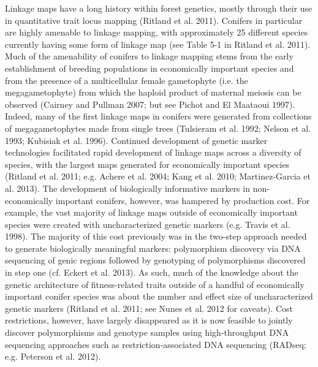 \documentclass[11pt]{article}
\begin{document}
Linkage maps have a long history within forest genetics, mostly through their use in quantitative trait locus mapping (Ritland et al. 2011). 
Conifers in particular are highly amenable to linkage mapping, with approximately 25 different species currently having some 
form of linkage map (see Table 5-1 in Ritland et al. 2011). Much of the amenability of conifers to linkage mapping stems from 
the early establishment of breeding populations in economically important species and from the presence of a multicellular 
female gametophyte (i.e. the megagametophyte) from which the haploid product of maternal meiosis can be observed (Cairney and Pullman 2007; 
but see Pichot and El Maataoui 1997). Indeed, many of the first linkage maps in conifers were generated from collections of 
megagametophytes made from single trees (Tulsieram et al. 1992; Nelson et al. 1993; Kubisiak et al. 1996). Continued development 
of genetic marker technologies facilitated rapid development of linkage maps across a diversity of species, with the largest maps 
generated for economically important species (Ritland et al. 2011; e.g. Achere et al. 2004; Kang et al. 2010; Martinez-Garcia et al. 2013). 
The development of biologically informative markers in non-economically important conifers, however, was hampered by production cost. 
For example, the vast majority of linkage maps outside of economically important species were created with uncharacterized genetic 
markers (e.g. Travis et al. 1998). The majority of this cost previously was in the two-step approach needed to generate biologically 
meaningful markers: polymorphism discovery via DNA sequencing of genic regions followed by genotyping of polymorphisms 
discovered in step one (cf. Eckert et al. 2013). As such, much of the knowledge about the genetic architecture of fitness-related 
traits outside of a handful of economically important conifer species was about the number and effect size of uncharacterized 
genetic markers (Ritland et al. 2011; see Nunes et al. 2012 for caveats). Cost restrictions, however, have largely disappeared 
as it is now feasible to jointly discover polymorphisms and genotype samples using high-throughput DNA sequencing approaches such as restriction-associated 
DNA sequencing (RADseq; e.g. Peterson et al. 2012). 
\end{document}

